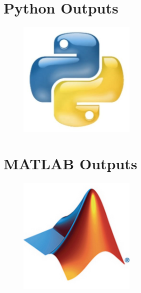 \documentclass{article}
\begin{document}
\section{Python Outputs}
\begin{figure}[h]
    \centering
    \includegraphics[width=0.5\textwidth]{Python-Logo.jpg}
\end{figure}

\vspace{2cm}  %


\section{MATLAB Outputs}
\begin{figure}[h]
    \centering
    \includegraphics[width=0.5\textwidth]{Matlab-Logo.jpg}
\end{figure}

\vspace{2cm}  %

\end{document}
